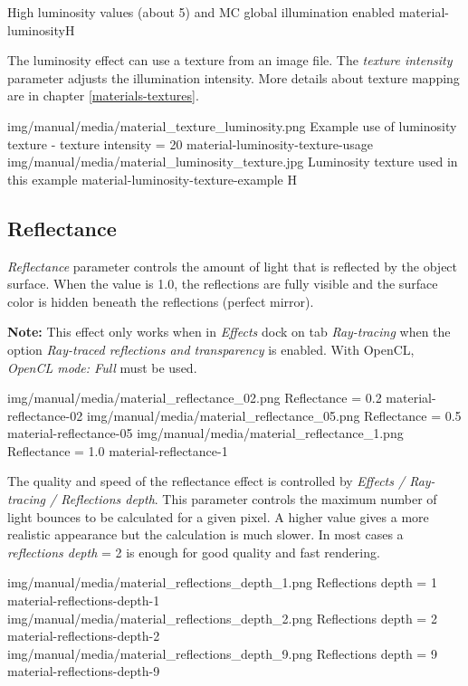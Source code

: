 {High luminosity values (about 5) and MC global illumination enabled}
{material-luminosity}{H}

The luminosity effect can use a texture from an image file. The \emph{texture intensity} parameter adjusts the illumination intensity. More details about texture mapping are in chapter \ref{materials-textures}.

\twoImagesWithTwoCaptionsFullWidth
{img/manual/media/material_texture_luminosity.png}
{Example use of luminosity texture - texture intensity = 20}
{material-luminosity-texture-usage}
{img/manual/media/material_luminosity_texture.jpg}
{Luminosity texture used in this example}
{material-luminosity-texture-example}
{H}

\subsection{Reflectance}\label{materials-reflectance}

\emph{Reflectance} parameter controls the amount of light that is reflected by the object surface. When the value is 1.0, the reflections are fully visible and the surface color is hidden beneath the reflections (perfect mirror).

\textbf{Note:} This effect only works when in \emph{Effects} dock on tab \emph{Ray-tracing} when the option \emph{Ray-traced reflections and transparency} is enabled. With OpenCL, \emph{OpenCL mode: Full} must be used.

\threeImagesWithTwoCaptionsFullWidth
{img/manual/media/material_reflectance_02.png}
{Reflectance = 0.2}
{material-reflectance-02}
{img/manual/media/material_reflectance_05.png}
{Reflectance = 0.5}
{material-reflectance-05}
{img/manual/media/material_reflectance_1.png}
{Reflectance = 1.0}
{material-reflectance-1}

The quality and speed of the reflectance effect is controlled by \emph{Effects / Ray-tracing / Reflections depth}. This parameter controls the maximum number of light bounces to be calculated for a given pixel. A higher value gives a more realistic appearance but the calculation is much slower. In most cases a \emph{reflections depth} = 2 is enough for good quality and fast rendering.

\threeImagesWithTwoCaptionsFullWidth
{img/manual/media/material_reflections_depth_1.png}
{Reflections depth = 1}
{material-reflections-depth-1}
{img/manual/media/material_reflections_depth_2.png}
{Reflections depth = 2}
{material-reflections-depth-2}
{img/manual/media/material_reflections_depth_9.png}
{Reflections depth = 9}
{material-reflections-depth-9}

